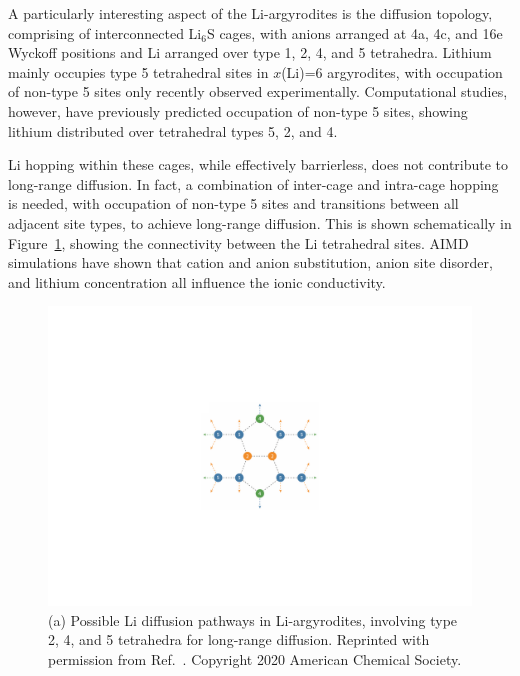 \documentclass[../main.tex]{subfiles}
\begin{document}
A particularly interesting aspect of the Li-argyrodites is the diffusion topology, comprising of interconnected Li$_6$S cages, with anions arranged at 4a, 4c, and 16e Wyckoff positions and Li arranged over type 1, 2, 4, and 5 tetrahedra.\cite{kuhs1979} Lithium mainly occupies type 5 tetrahedral sites in $x$(Li)=6 argyrodites, with occupation of non-type 5 sites only recently observed experimentally.\cite{ohno2019further,gautamengineering} Computational studies, however, have previously predicted occupation of non-type 5 sites, showing lithium distributed over tetrahedral types 5, 2, and 4.\cite{deiseroth_li6ps5x_2008, Minafra2020, morgan2020mechanistic}

Li hopping within these cages, while effectively barrierless, does not contribute to long-range diffusion. In fact, a combination of inter-cage and intra-cage hopping is needed, with occupation of non-type 5 sites and transitions between all adjacent site types, to achieve long-range diffusion. This is shown schematically in Figure~\ref{fig:diffusion_pathways}, showing the connectivity between the Li tetrahedral sites. AIMD simulations have shown that cation and anion substitution,\cite{ohno2019further,deklerk2016} anion site disorder,\cite{gautamengineering,morgan2020mechanistic} and lithium concentration\cite{Deng2017, yu_superionic_2020, Feng_2020} all influence the ionic conductivity.

\begin{figure}
    \centering
    \includegraphics[scale=0.65]{figures/diffusion_pathways.pdf}
    \caption{(a) Possible Li diffusion pathways in Li-argyrodites, involving type 2, 4, and 5 tetrahedra for long-range diffusion. Reprinted with permission from Ref.~. Copyright 2020 American Chemical Society.}
    \label{fig:diffusion_pathways}
\end{figure}
\end{document}
